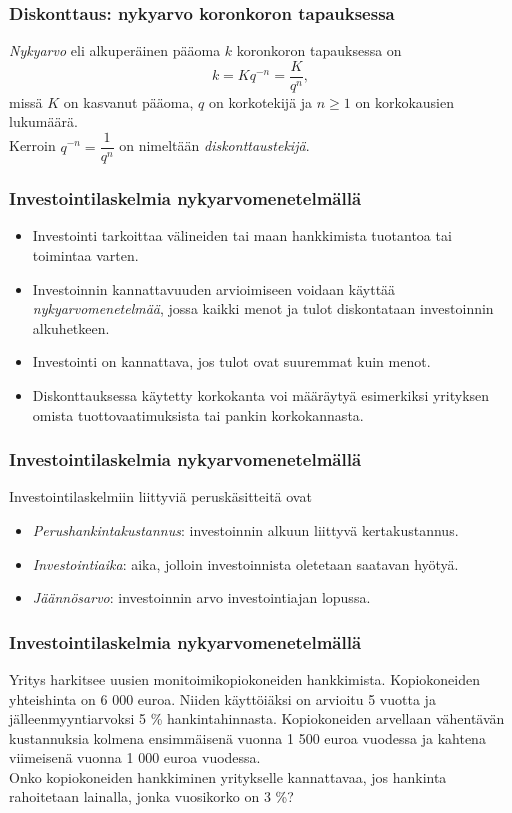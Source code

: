 \documentclass{beamer}
\newcommand{\pblock}{\\ \vspace{0.5cm}\pause}
\begin{document}
\begin{frame}
    \frametitle{Diskonttaus: nykyarvo koronkoron tapauksessa}
    \pause
    \begin{block}{}
        \emph{Nykyarvo} eli alkuperäinen pääoma $k$ koronkoron tapauksessa on
        \[
            k = Kq^{-n} = \frac{K}{q^n},
        \]
        missä $K$ on kasvanut pääoma, $q$ on korkotekijä ja $n \geq 1$ on korkokausien lukumäärä.
        \pblock
        Kerroin $q^{-n} = \dfrac{1}{q^n}$ on nimeltään \emph{diskonttaustekijä}.
    \end{block}
\end{frame}

\begin{frame}
    \frametitle{Investointilaskelmia nykyarvomenetelmällä}
    \begin{itemize}
        \item {Investointi} tarkoittaa välineiden tai maan hankkimista tuotantoa tai toimintaa varten. \pause
        \item Investoinnin kannattavuuden arvioimiseen voidaan käyttää \emph{nykyarvomenetelmää}, jossa kaikki menot ja tulot diskontataan investoinnin alkuhetkeen.  \pause
        \item Investointi on kannattava, jos tulot ovat suuremmat kuin menot. \pause
        \item Diskonttauksessa käytetty korkokanta voi määräytyä esimerkiksi yrityksen omista tuottovaatimuksista tai pankin korkokannasta.
    \end{itemize}
\end{frame}

\begin{frame}
    \frametitle{Investointilaskelmia nykyarvomenetelmällä}
    Investointilaskelmiin liittyviä peruskäsitteitä ovat \pause
    \begin{itemize}
        \item \emph{Perushankintakustannus}: investoinnin alkuun liittyvä kertakustannus. \pause
        \item \emph{Investointiaika}: aika, jolloin investoinnista oletetaan saatavan hyötyä. \pause
        \item \emph{Jäännösarvo}: investoinnin arvo investointiajan lopussa.
    \end{itemize}
\end{frame}

\begin{frame}
\frametitle{Investointilaskelmia nykyarvomenetelmällä}
    \begin{esim}
    Yritys harkitsee uusien monitoimikopiokoneiden hankkimista.
    Kopiokoneiden yhteishinta on 6 000 euroa. Niiden käyttöiäksi on arvioitu 5 vuotta ja jälleenmyyntiarvoksi 5 \% hankintahinnasta.
    Kopiokoneiden arvellaan vähentävän kustannuksia kolmena ensimmäisenä vuonna 1 500 euroa vuodessa ja kahtena viimeisenä vuonna 1 000 euroa vuodessa.
    \pblock
    Onko kopiokoneiden hankkiminen yritykselle kannattavaa, jos hankinta rahoitetaan lainalla, jonka vuosikorko on 3 \%?
    \end{esim}
\end{frame}
\end{document}
